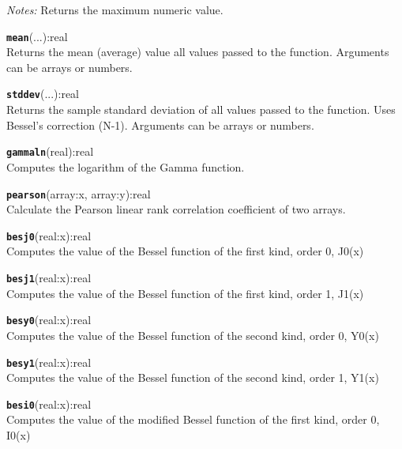 \emph{Notes:} Returns the maximum numeric value.

\hrulefill

\texttt{{\large\textbf{mean}}}\textsf{(...):real}\\
 Returns the mean (average) value all values passed to the function. Arguments can be arrays or numbers.

\hrulefill

\texttt{{\large\textbf{stddev}}}\textsf{(...):real}\\
 Returns the sample standard deviation of all values passed to the function. Uses Bessel's correction (N-1). Arguments can be arrays or numbers.

\hrulefill

\texttt{{\large\textbf{gammaln}}}\textsf{(real):real}\\
 Computes the logarithm of the Gamma function.

\hrulefill

\texttt{{\large\textbf{pearson}}}\textsf{(array:x, array:y):real}\\
 Calculate the Pearson linear rank correlation coefficient of two arrays.

\hrulefill

\texttt{{\large\textbf{besj0}}}\textsf{(real:x):real}\\
 Computes the value of the Bessel function of the first kind, order 0, J0(x)

\hrulefill

\texttt{{\large\textbf{besj1}}}\textsf{(real:x):real}\\
 Computes the value of the Bessel function of the first kind, order 1, J1(x)

\hrulefill

\texttt{{\large\textbf{besy0}}}\textsf{(real:x):real}\\
 Computes the value of the Bessel function of the second kind, order 0, Y0(x)

\hrulefill

\texttt{{\large\textbf{besy1}}}\textsf{(real:x):real}\\
 Computes the value of the Bessel function of the second kind, order 1, Y1(x)

\hrulefill

\texttt{{\large\textbf{besi0}}}\textsf{(real:x):real}\\
 Computes the value of the modified Bessel function of the first kind, order 0, I0(x)

\hrulefill


